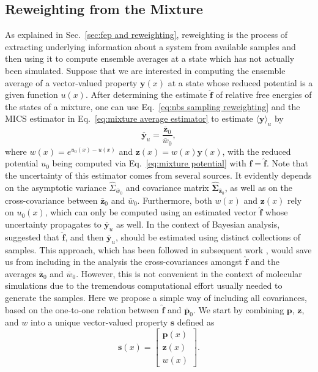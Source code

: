 \documentclass[journal=jctcce,manuscript=article,layout=twocolumn]{achemso}
\newcommand{\mt}[1]{\boldsymbol{\mathbf{#1}}}   %
\newcommand{\vt}[1]{\boldsymbol{\mathbf{#1}}}   %
\begin{document}
\subsection{Reweighting from the Mixture}

As explained in Sec.~\ref{sec:fep and reweighting}, reweighting is the process of extracting underlying information about a system from available samples and then using it to compute ensemble averages at a state which has not actually been simulated. Suppose that we are interested in computing the ensemble average of a vector-valued property $\vt y(x)$ at a state whose reduced potential is a given function $u(x)$. After determining the estimate $\hat{\vt f}$ of relative free energies of the states of a mixture, one can use Eq.~\eqref{eq:nbs sampling reweighting} and the MICS estimator in Eq.~\eqref{eq:mixture average estimator} to estimate $\langle \vt y \rangle_u$ by
\begin{equation}
\label{eq:reweighting from mixture}
\overline{\vt y}_u = \frac{\overline{\vt z}_0}{\overline{w}_0},
\end{equation}
where $w(x) = e^{u_0(x) - u(x)}$ and ${\vt z}(x) = w(x) {\vt y}(x)$, with the reduced potential $u_0$ being computed via Eq.~\eqref{eq:mixture potential} with $\vt f = \hat{\vt f}$. Note that the uncertainty of this estimator comes from several sources. It evidently depends on the asymptotic variance $\hat \Sigma_{\overline w_0}$ and covariance matrix $\hat{\mt \Sigma}_{\overline{\vt z}_0}$, as well as on the cross-covariance between $\overline{\vt z}_0$ and $\overline w_0$. Furthermore, both $w(x)$ and $\vt z(x)$ rely on $u_0(x)$, which can only be computed using an estimated vector $\hat{\vt f}$ whose uncertainty propagates to $\overline{\vt y}_u$ as well. In the context of Bayesian analysis, \citeauthor{Buta_2011} \cite{Buta_2011} suggested that $\hat{\vt f}$, and then $\overline{\vt y}_u$, should be estimated using distinct collections of samples. This approach, which has been followed in subsequent work \cite{Tan_2015, Roy_2018}, would save us from including in the analysis the cross-covariances amongst $\hat{\vt f}$ and the averages $\overline{\vt z}_0$ and $\overline w_0$. However, this is not convenient in the context of molecular simulations due to the tremendous computational effort usually needed to generate the samples. Here we propose a simple way of including all covariances, based on the one-to-one relation between $\hat{\vt f}$ and $\overline{\vt p}_0$. We start by combining $\vt p$, $\vt z$, and $w$ into a unique vector-valued property $\vt s$ defined as
\begin{equation*}
\vt s(x) = \left[\begin{array}{c}
\vt p(x) \\
\vt z(x) \\
w(x)
\end{array}\right].
\end{equation*}
\end{document}
